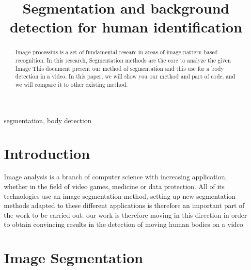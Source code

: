\documentclass[conference]{IEEEtran}
\begin{document}
\title{Segmentation and background detection for human identification\\
}

\author{
\and
{}
}

\maketitle

\begin{abstract}
Image processins is  a set of fundamental researc in areas of image pattern based recognition.
In this research, Segmentation methods are the core to analyze the given Image
This document present our method of segmentation and this use for a body detection in a video.
In this paper, we will show you our method and part of code, and we will compare it to other existing method.
\end{abstract}

\begin{IEEEkeywords}
segmentation, body detection
\end{IEEEkeywords}

\section{Introduction}
Image analysis is a branch of computer science with increasing application, whether in the field of video games, medicine or data protection. All of its technologies use an image segmentation method, setting up new segmentation methods adapted to these different applications is therefore an important part of the work to be carried out. our work is therefore moving in this direction in order to obtain convincing results in the detection of moving human bodies on a video

\section{Image Segmentation}
\end{document}
